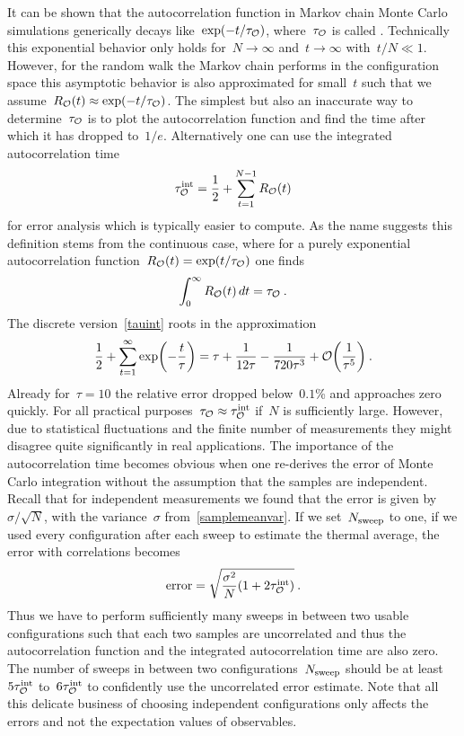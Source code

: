 It can be shown that the autocorrelation function in Markov chain Monte Carlo
simulations generically decays like~$\exp(-t/\tau_{\mathcal{O}})$, where~$\tau_{\mathcal{O}}$ is
called . Technically this exponential behavior
only holds for~$N \to \infty$ and~$t \to \infty$ with~$t/N \ll 1$. However, for
the random walk the Markov chain performs in the configuration space this
asymptotic behavior is also approximated for small~$t$ such that we
assume~$R_{\mathcal{O}}(t) \approx \exp(-t/\tau_{\mathcal{O}})$. The simplest but also an
inaccurate way to determine~$\tau_{\mathcal{O}}$ is to plot the autocorrelation function
and find the time after which it has dropped to~$1/e$. Alternatively one can
use the integrated autocorrelation time
%
\begin{equation}\label{tauint}
  \tau^{\mathrm{int}}_{\mathcal{O}} = \frac{1}{2} + \sum_{t=1}^{N-1} R_{\mathcal{O}}(t)
\end{equation}
%
for error analysis which is typically easier to compute. As the name suggests
this definition stems from the continuous case, where for a purely exponential
autocorrelation function~$R_{\mathcal{O}}(t) = \exp(t/\tau_{\mathcal{O}})$ one finds
%
\begin{equation}
  \int_0^{\infty} R_{\mathcal{O}}(t) \,dt = \tau_{\mathcal{O}}\:.
\end{equation}
%
The discrete version~\eqref{tauint} roots in the approximation
%
\begin{equation}
  \frac{1}{2} + \sum_{t=1}^{\infty} \exp \biggl( - \frac{t}{\tau} \biggr) =
    \tau + \frac{1}{12 \tau} - \frac{1}{720 \tau^3} +
    \mathcal{O}\biggl( \frac{1}{\tau^5} \biggr)\:.
\end{equation}
%
Already for~$\tau = 10$ the relative error dropped below~$0.1$\% and approaches
zero quickly. For all practical purposes~$\tau_{\mathcal{O}} \approx \tau^{\mathrm{int}}_{\mathcal{O}}$
if~$N$ is sufficiently large. However, due to statistical fluctuations and the
finite number of measurements they might disagree quite significantly in real
applications. The importance of the autocorrelation time becomes obvious when
one re-derives the error of Monte Carlo integration without the assumption that
the samples are independent. Recall that for independent measurements we found
that the error is given by~$\sigma/\sqrt{N}$, with the variance~$\sigma$
from~\eqref{samplemeanvar}. If we set~$N_{\mathrm{sweep}}$ to one, \ie{} if we used every
configuration after each sweep to estimate the thermal average, the error with
correlations becomes
%
\begin{equation}\label{correrror}
  \text{error} = \sqrt{\frac{\sigma^2}{N}(1 + 2\tau^{\mathrm{int}}_{\mathcal{O}})}\:.
\end{equation}
%
Thus we have to perform sufficiently many sweeps in between two usable
configurations such that each two samples are uncorrelated and thus the
autocorrelation function and the integrated autocorrelation time are also zero.
The number of sweeps in between two configurations~$N_{\mathrm{sweep}}$ should be at
least~$5 \tau^{\mathrm{int}}_{\mathcal{O}}$ to~$6 \tau^{\mathrm{int}}_{\mathcal{O}}$ to confidently use the uncorrelated
error estimate. Note that all this delicate business of choosing independent
configurations only affects the errors and not the expectation values of
observables.

